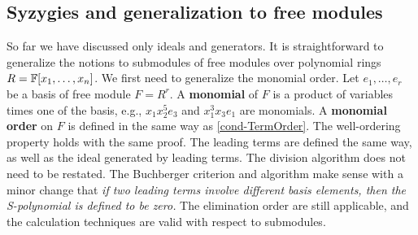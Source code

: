 \subsection*{Syzygies and generalization to free modules}

So far we have discussed only ideals and generators.
It is straightforward to generalize the notions to submodules 
of free modules over polynomial rings $R = \mathbb{F}[x_1,\ldots,x_n]$.
We first need to generalize the monomial order.
Let $e_1,\ldots,e_r$ be a basis of free module $F = R^r$.
A {\bf monomial} of $F$ is a product of variables times one of the basis,
e.g., $x_1 x_2^5 e_3$ and $x_1^3 x_3 e_1$ are monomials.
A {\bf monomial order} on $F$ is defined in the same way as \eqref{cond-TermOrder}.
The well-ordering property holds with the same proof.
The leading terms are defined the same way, as well as the ideal generated by leading terms.
The division algorithm does not need to be restated.
The Buchberger criterion and algorithm make sense with a minor change that
{\em if two leading terms involve different basis elements, then the S-polynomial is defined to be zero.}
The elimination order are still applicable, and the calculation techniques are valid with respect to submodules.


